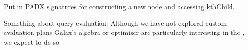 Put in PADX signatures for constructing a new node and accessing
kthChild. 

Something about query evaluation:
Although we have not explored custom evaluation plans 
Galax's algebra or optimizer are particularly interesting in the 
\padx{}, we expect to do so 

